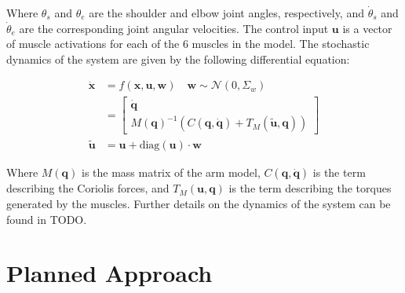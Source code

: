 \documentclass[table,12pt]{article}
\begin{document}
Where $\theta_s$ and $\theta_e$ are the shoulder and elbow joint angles, respectively, and $\dot{\theta}_s$ and $\dot{\theta}_e$ are the corresponding joint angular velocities. The control input $\mathbf{u}$ is a vector of muscle activations for each of the 6 muscles in the model. The stochastic dynamics of the system are given by the following differential equation:

\begin{align}
    \dot{\mathbf{x}} &= f(\mathbf{x}, \mathbf{u}, \mathbf{w}) \quad \mathbf{w} \sim \mathcal{N}(0, \Sigma_w) \\
    &= \begin{bmatrix}
        \dot{\mathbf{q}} \\
        M(\mathbf{q})^{-1} \left(C(\mathbf{q}, \dot{\mathbf{q}}) + T_M(\tilde{\mathbf{u}}, \mathbf{q})\right)
    \end{bmatrix} \\
    \tilde{\mathbf{u}} &= \mathbf{u} + \text{diag}(\mathbf{u}) \cdot \mathbf{w}
\end{align}

Where $M(\mathbf{q})$ is the mass matrix of the arm model, $C(\mathbf{q}, \dot{\mathbf{q}})$ is the term describing the Coriolis forces, and $T_M(\mathbf{u}, \mathbf{q})$ is the term describing the torques generated by the muscles. Further details on the dynamics of the system can be found in TODO.

\section{Planned Approach}
\end{document}
